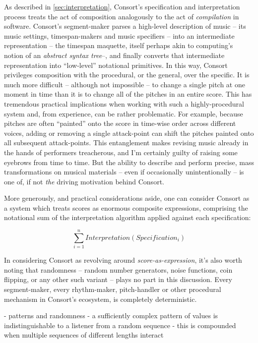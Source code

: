 As described in \autoref{sec:interpretation}, Consort's specification and
interpretation process treats the act of composition analogously to the act of
\emph{compilation} in software. Consort's segment-maker parses a high-level
description of music -- its music settings, timespan-makers and music
specifiers -- into an intermediate representation -- the timespan maquette,
itself perhaps akin to computing's notion of an \emph{abstract syntax tree}--,
and finally converts that intermediate representation into \enquote{low-level}
notational primitives. In this way, Consort privileges composition with the
procedural, or the general, over the specific. It is much more difficult --
although not impossible -- to change a single pitch at one moment in time than
it is to change all of the pitches in an entire score. This has tremendous
practical implications when working with such a highly-procedural system and,
from experience, can be rather problematic. For example, because pitches are
often \enquote{painted} onto the score in time-wise order across different
voices, adding or removing a single attack-point can shift the pitches painted
onto all subsequent attack-points. This entanglement makes revising music
already in the hands of performers treacherous, and I'm certainly guilty of
raising some eyebrows from time to time. But the ability to describe and
perform precise, mass transformations on musical materials -- even if
occasionally unintentionally -- is one of, if not \emph{the} driving motivation
behind Consort. 


More generously, and practical considerations aside, one can consider Consort
as a system which treats scores as enormous composite expressions, comprising
the notational sum of the interpretation algorithm applied against each
specification:

\begin{equation}
\displaystyle\sum_{i=1}^{n} Interpretation(Specification_i)
\end{equation}

\noindent In considering Consort as revolving around
\emph{score-as-expression}, it's also worth noting that randomness -- random
number generators, noise functions, coin flipping, or any other such variant --
plays no part in this discussion. Every segment-maker, every rhythm-maker,
pitch-handler or other procedural mechanism in Consort's ecosystem, is
completely deterministic.

\begin{markdown}
-   patterns and randomness
    -   a sufficiently complex pattern of values is indistinguishable to a
        listener from a random sequence
    -   this is compounded when multiple sequences of different lengths
        interact
\end{markdown}


